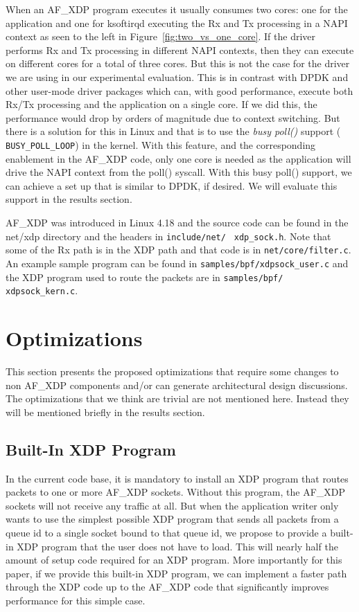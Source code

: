\documentclass[9pt,numbers,reprint]{sigplanconf}
\begin{document}
When an AF\_XDP program executes it usually consumes two cores: one
for the application and one for ksoftirqd executing the Rx and Tx
processing in a NAPI context as seen to the left in
Figure~\ref{fig:two_vs_one_core}. If the driver performs Rx and Tx
processing in different NAPI contexts, then they can execute on
different cores for a total of three cores. But this is not the case
for the driver we are using in our experimental evaluation. This is in
contrast with DPDK and other user-mode driver packages which can, with
good performance, execute both Rx/Tx processing and the application on
a single core. If we did this, the performance would drop by orders of
magnitude due to context switching. But there is a solution for this
in Linux and that is to use the \emph{busy poll()} support ({\tt
  BUSY\_POLL\_LOOP}) in the kernel. With this feature, and the
corresponding enablement in the AF\_XDP code, only one core is needed
as the application will drive the NAPI context from the poll()
syscall. With this busy poll() support, we can achieve a set up that
is similar to DPDK, if desired. We will evaluate this support in the
results section.

AF\_XDP was introduced in Linux 4.18 and the source code can be found
in the net/xdp directory and the headers in \texttt{include/net/} {\tt
  xdp\_sock.h}. Note that some of the Rx path is in the XDP path and
that code is in \texttt{net/core/filter.c}. An example sample program
can be found in \texttt{samples/bpf/xdpsock\_user.c} and the XDP
program used to route the packets are in
\texttt{samples/bpf/} {\tt xdpsock\_kern.c}.


\section{Optimizations}
\label{sec:opt}

This section presents the proposed optimizations that require some
changes to non AF\_XDP components and/or can generate architectural
design discussions. The optimizations that we think are trivial are
not mentioned here. Instead they will be mentioned briefly in the
results section.


\subsection{Built-In XDP Program}

In the current code base, it is mandatory to install an XDP program
that routes packets to one or more AF\_XDP sockets. Without this
program, the AF\_XDP sockets will not receive any traffic at all. But
when the application writer only wants to use the simplest possible
XDP program that sends all packets from a queue id to a single socket
bound to that queue id, we propose to provide a built-in XDP program
that the user does not have to load. This will nearly half the amount
of setup code required for an XDP program. More importantly for this
paper, if we provide this built-in XDP program, we can implement a
faster path through the XDP code up to the AF\_XDP code that
significantly improves performance for this simple case.
\end{document}
